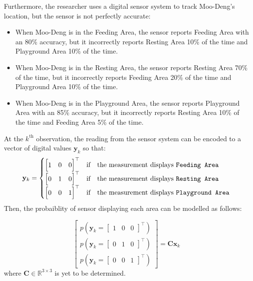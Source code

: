 Furthermore, the researcher uses a digital sensor system to track Moo-Deng’s location, but the sensor is not perfectly accurate:
\begin{itemize}
    \item When Moo-Deng is in the Feeding Area, the sensor reports Feeding Area with an 80\% accuracy, but it incorrectly reports Resting Area 10\% of the time and Playground Area 10\% of the time.
    \item When Moo-Deng is in the Resting Area, the sensor reports Resting Area 70\% of the time, but it incorrectly reports Feeding Area 20\% of the time and Playground Area 10\% of the time.
    \item When Moo-Deng is in the Playground Area, the sensor reports Playground Area with an 85\% accuracy, but it incorrectly reports Resting Area 10\% of the time and Feeding Area 5\% of the time.
\end{itemize}
At the $k^\text{th}$ observation, the reading from the sensor system can be encoded to a vector of digital values $\mathbf{y}_k$ so that:
\begin{equation*}
    \mathbf{y}_k=\begin{cases}
        \begin{bmatrix}
            1 & 0 & 0
        \end{bmatrix}^\top & \text{if} \quad\text{the measurement displays \texttt{Feeding Area}}\\
        \begin{bmatrix}
            0 & 1 & 0
        \end{bmatrix}^\top & \text{if} \quad\text{the measurement displays \texttt{Resting Area}}\\
        \begin{bmatrix}
            0 & 0 & 1
        \end{bmatrix}^\top & \text{if} \quad\text{the measurement displays \texttt{Playground Area}}
    \end{cases}    
\end{equation*}
Then, the probaiblity of sensor displaying each area can be modelled as follows:

\begin{equation*}
    \begin{bmatrix}
        p(\mathbf{y}_k=\begin{bmatrix}
            1 & 0 &0
        \end{bmatrix}^\top)\\
        p(\mathbf{y}_k=\begin{bmatrix}
            0 & 1 &0
        \end{bmatrix}^\top)\\
        p(\mathbf{y}_k=\begin{bmatrix}
            0 & 0 &1
        \end{bmatrix}^\top)
    \end{bmatrix}=\mathbf{C}\mathbf{x}_k
\end{equation*}
where $\mathbf{C}\in\mathbb{R}^{3\times3}$ is yet to be determined.

